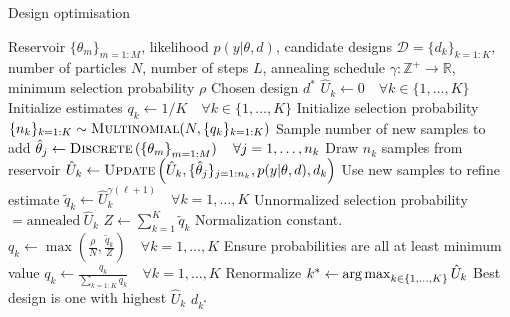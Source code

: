 \begin{algorithm}[t]
	\small
	\captionsetup{labelfont=bf, justification=justified,singlelinecheck=false}
	\caption{Design optimisation \label{alg:des-opt}}
	\begin{algorithmic}[1]
		\renewcommand{\algorithmicrequire}{\textbf{Inputs:}}
		\renewcommand{\algorithmicensure}{\textbf{Outputs:}}				 
		\Require Reservoir $\{\theta_m\}_{m=1:M}$, likelihood $p(y | \theta, d)$,
		candidate designs $\mathcal{D} = \{d_k\}_{k=1:K}$, number of particles $N$, number of steps
		$L$, annealing schedule $\gamma : \mathbb{Z}^+ \rightarrow \mathbb{R}$, minimum selection probability $\rho$
		\Ensure Chosen design $d^*$
		\State $\hat{U}_k \leftarrow 0 \quad \forall k \in \{1,\dots,K\}$ \Comment Initialize estimates
		\State $q_k \leftarrow 1/K \quad \forall k \in \{1,\dots,K\}$ \Comment Initialize selection probability
		\State $\{n_k\}_{k=1:K} \sim \textsc{Multinomial}(N,\{q_k\}_{k=1:K})$ \label{line:des-opt:sample-nsamples}
		\Comment Sample number of new samples to add\footnotemark
		\State $\hat{\theta}_{j} \leftarrow \textsc{Discrete}\left(\left\{\theta_m\right\}_{m=1:M}\right) \quad \forall j=1,\dots,n_k$ \label{line:des-opt:draw-theta}
		\Comment Draw $n_k$ samples from reservoir
		\State $\hat{U}_k \leftarrow \textsc{Update}\left(\hat{U}_k,\{\hat{\theta}_j\}_{j=1:n_k},p(y | \theta, d),d_k\right)$
		\label{line:des-opt:refine-U}
		\Comment Use new samples to refine estimate %
		\EndFor	
		\State $\tilde{q}_k \leftarrow \hat{U}_k^{\gamma(\ell+1)} \quad \forall k = 1,\dots,K$ 
		\label{line:des-opt:set-p}
		\Comment Unnormalized selection probability $= \text{annealed} ~\hat{U}_k$
		\State $Z \leftarrow \sum_{k=1}^{K} \tilde{q}_k $ \Comment Normalization constant.
		\State $q_k \leftarrow \max\left(\frac{\rho}{N},\frac{\tilde{q}_k }{Z}\right) \quad \forall k = 1,\dots,K$ \Comment Ensure probabilities are all at least minimum value
		\State $q_k \leftarrow \frac{q_k}{\sum_{k=1:K} q_k} \quad \forall k = 1,\dots,K$ 
		\label{line:des-opt:renorm}
		\Comment Renormalize
		\EndFor	
		\State $k^* \leftarrow \operatorname*{arg\,max}_{k \in \{1,\dots,K\}} \hat{U}_k$ \Comment Best design is one with highest $\hat{U}_k$
		\State \Return $d_{k^*}$
	\end{algorithmic}
\end{algorithm}

